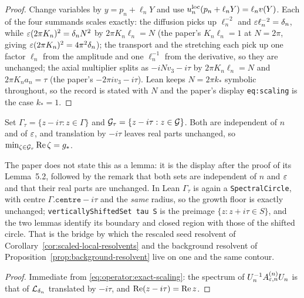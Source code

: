 \begin{proof}
  \leanok
  Change variables by $y=p_n+\ell_nY$ and use
  $u_n^{\rm loc}(p_n+\ell_nY)=\ell_nv(Y)$.  Each of the four summands scales exactly: the
  diffusion picks up $\ell_n^{-2}$ and $\varepsilon\ell_n^{-2}=\delta_n$, while
  $\varepsilon(2\pi K_n)^2=\delta_nN^2$ by $2\pi K_n\ell_n=N$ (the paper's $K_n\ell_n=1$ at
  $N=2\pi$, giving $\varepsilon(2\pi K_n)^2=4\pi^2\delta_n$); the transport and the stretching each
  pick up one factor $\ell_n$ from the amplitude and one $\ell_n^{-1}$ from the derivative,
  so they are unchanged; the axial multiplier splits as $-iNv_3-i\tau$ by
  $2\pi K_n\ell_n=N$ and $2\pi K_na_n=\tau$ (the paper's $-2\pi iv_3-i\tau$).  Lean keeps
  $N=2\pi k_*$ symbolic throughout, so the record is stated with $N$ and the paper's
  display \texttt{eq:scaling} is the case $k_*=1$.
\end{proof}

\begin{lemma}
  \label{lem:operator:shifted-contour}
  \leanok
  Set $\Gamma_\tau=\{z-i\tau:z\in\Gamma\}$ and $\mathcal{G}_\tau=\{z-i\tau:z\in\mathcal{G}\}$.  Both are
  independent of $n$ and of $\varepsilon$, and translation by $-i\tau$ leaves real parts
  unchanged, so $\min_{\zeta\in\mathcal{G}_\tau}\operatorname{Re}\zeta=g_*$.
\end{lemma}

The paper does not state this as a lemma: it is the display after the proof of its
Lemma~5.2, followed by the remark that both sets are independent of $n$ and $\varepsilon$ and that
their real parts are unchanged.  In Lean $\Gamma_\tau$ is again a \texttt{SpectralCircle}, with centre
$\Gamma.\texttt{centre}-i\tau$ and the \emph{same} radius, so the growth floor is exactly
unchanged; \texttt{verticallyShiftedSet tau S} is the preimage $\{z:z+i\tau\in S\}$, and
the two lemmas identify its boundary and closed region with those of the shifted circle.
That is the bridge by which the rescaled seed resolvent of
Corollary~\ref{cor:scaled-local-resolvents} and the background resolvent of
Proposition~\ref{prop:background-resolvent} live on one and the same contour.

\begin{proof}
  \leanok
  Immediate from \eqref{eq:operator:exact-scaling}: the spectrum of
  $U_n^{-1}A^{(n)}_{\varepsilon,n}U_n$ is that of $\mathcal{L}_{\delta_n}$ translated by $-i\tau$, and
  $\operatorname{Re}(z-i\tau)=\operatorname{Re} z$.
\end{proof}
